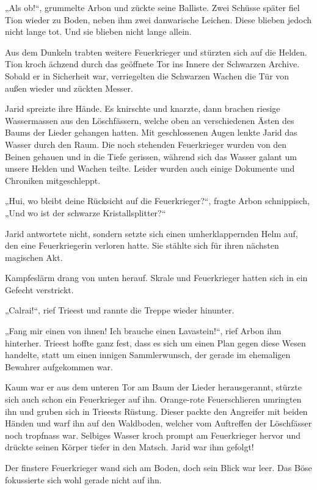 „Als ob!“, grummelte Arbon und zückte seine Balliste. Zwei Schüsse später fiel Tion wieder zu Boden, neben ihm zwei danwarische Leichen. Diese blieben jedoch nicht lange tot. Und sie blieben nicht lange allein.

Aus dem Dunkeln trabten weitere Feuerkrieger und stürzten sich auf die Helden. Tion kroch ächzend durch das geöffnete Tor ins Innere der Schwarzen Archive. Sobald er in Sicherheit war, verriegelten die Schwarzen Wachen die Tür von außen wieder und zückten Messer.

Jarid spreizte ihre Hände. Es knirschte und knarzte, dann brachen riesige Wassermassen aus den Löschfässern, welche oben an verschiedenen Ästen des Baums der Lieder gehangen hatten. Mit geschlossenen Augen lenkte Jarid das Wasser durch den Raum. Die noch stehenden Feuerkrieger wurden von den Beinen gehauen und in die Tiefe gerissen, während sich das Wasser galant um unsere Helden und Wachen teilte. Leider wurden auch einige Dokumente und Chroniken mitgeschleppt.

„Hui, wo bleibt deine Rücksicht auf die Feuerkrieger?“, fragte Arbon schnippisch, „Und wo ist der schwarze Kristallsplitter?“

Jarid antwortete nicht, sondern setzte sich einen umherklappernden Helm auf, den eine Feuerkriegerin verloren hatte. Sie stählte sich für ihren nächsten magischen Akt.

Kampfeslärm drang von unten herauf. Skrale und Feuerkrieger hatten sich in ein Gefecht verstrickt.

„Calrai!“, rief Trieest und rannte die Treppe wieder hinunter.

„Fang mir einen von ihnen! Ich brauche einen Lavastein!“, rief Arbon ihm hinterher. Trieest hoffte ganz fest, dass es sich um einen Plan gegen diese Wesen handelte, statt um einen innigen Sammlerwunsch, der gerade im ehemaligen Bewahrer aufgekommen war.

Kaum war er aus dem unteren Tor am Baum der Lieder herausgerannt, stürzte sich auch schon ein Feuerkrieger auf ihn. Orange-rote Feuerschlieren umringten ihn und gruben sich in Trieests Rüstung. Dieser packte den Angreifer mit beiden Händen und warf ihn auf den Waldboden, welcher vom Auftreffen der Löschfässer noch tropfnass war. Selbiges Wasser kroch prompt am Feuerkrieger hervor und drückte seinen Körper tiefer in den Matsch. Jarid war ihm gefolgt!

Der finstere Feuerkrieger wand sich am Boden, doch sein Blick war leer. Das Böse fokussierte sich wohl gerade nicht auf ihn.

